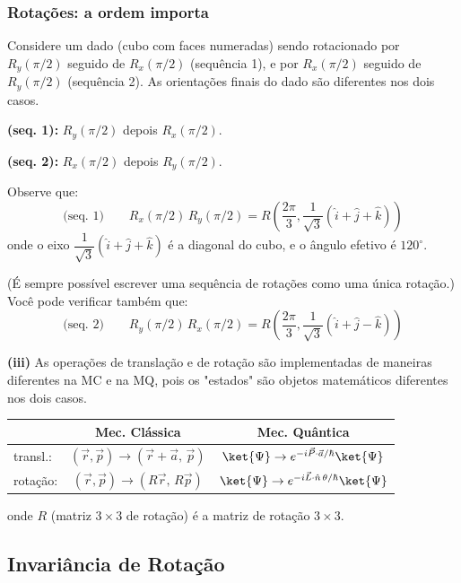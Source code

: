 \subsubsection*{Rotações: a ordem importa}

Considere um dado (cubo com faces numeradas) sendo rotacionado por $R_y(\pi/2)$ seguido de $R_x(\pi/2)$ (sequência 1), e por $R_x(\pi/2)$ seguido de $R_y(\pi/2)$ (sequência 2). As orientações finais do dado são diferentes nos dois casos.

\textbf{(seq. 1):} $R_y(\pi/2)$ depois $R_x(\pi/2)$.

\textbf{(seq. 2):} $R_x(\pi/2)$ depois $R_y(\pi/2)$.

Observe que:
\begin{equation}
    \text{(seq. 1)} \qquad R_x(\pi/2)\,R_y(\pi/2) = R\left(\frac{2\pi}{3}, \frac{1}{\sqrt{3}}(\hat{i}+\hat{j}+\hat{k})\right)
\label{eq:aula21_seq1}
\end{equation}
onde o eixo $\dfrac{1}{\sqrt{3}}(\hat{i}+\hat{j}+\hat{k})$ é a diagonal do cubo, e o ângulo efetivo é $120^\circ$.

(É sempre possível escrever uma sequência de rotações como uma única rotação.) Você pode verificar também que:
\begin{equation}
    \text{(seq. 2)} \qquad R_y(\pi/2)\,R_x(\pi/2) = R\left(\frac{2\pi}{3}, \frac{1}{\sqrt{3}}(\hat{i}+\hat{j}-\hat{k})\right)
\label{eq:aula21_seq2}
\end{equation}

\textbf{(iii)} As operações de translação e de rotação são implementadas de maneiras diferentes na MC e na MQ, pois os "estados" são objetos matemáticos diferentes nos dois casos.

\begin{center}
\begin{tabular}{|l|c|c|}
\hline
 & Mec. Clássica & Mec. Quântica \\
\hline
transl.: & $(\vec{r},\vec{p}) \to (\vec{r}+\vec{a},\,\vec{p})$ & $\ket{\Psi} \to e^{-i\vec{P}\cdot\vec{a}/\hbar}\ket{\Psi}$ \\
\hline
rotação: & $(\vec{r},\vec{p}) \to (R\vec{r},\,R\vec{p})$ & $\ket{\Psi} \to e^{-i\vec{L}\cdot\hat{n}\,\theta/\hbar}\ket{\Psi}$ \\
\hline
\end{tabular}
\end{center}
onde $R$ (matriz $3\times 3$ de rotação) é a matriz de rotação $3\times 3$.

\subsection*{Invariância de Rotação}

